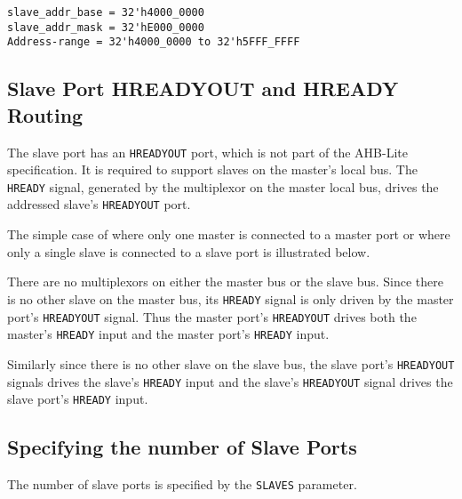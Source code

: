 \begin{verbatim}
slave_addr_base = 32'h4000_0000
slave_addr_mask = 32'hE000_0000
Address-range = 32'h4000_0000 to 32'h5FFF_FFFF
\end{verbatim}

\subsection{Slave Port HREADYOUT and HREADY
Routing}\label{slave-port-hreadyout-and-hready-routing}

The slave port has an \texttt{HREADYOUT} port, which is not part of the AHB-Lite
specification. It is required to support slaves on the master's local
bus. The \texttt{HREADY} signal, generated by the multiplexor on the master local bus, drives the addressed slave’s \texttt{HREADYOUT} port.

The simple case of where only one master is connected to a master port
or where only a single slave is connected to a slave port is illustrated
below.

There are no multiplexors on either the master bus or the slave bus.
Since there is no other slave on the master bus, its \texttt{HREADY} signal is
only driven by the master port's \texttt{HREADYOUT} signal. Thus the master
port's \texttt{HREADYOUT} drives both the master's \texttt{HREADY} input and the master
port's \texttt{HREADY} input.

Similarly since there is no other slave on the slave bus, the slave
port's \texttt{HREADYOUT} signals drives the slave's \texttt{HREADY} input and the slave's
\texttt{HREADYOUT} signal drives the slave port's \texttt{HREADY} input.

\newpage

\subsection{Specifying the number of Slave
Ports}\label{specifying-the-number-of-slave-ports}

The number of slave ports is specified by the \texttt{SLAVES} parameter.
